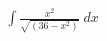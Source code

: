 \documentclass[preview]{standalone}
\begin{document}
\begin{align*}
\int \frac{x^2}{\sqrt{(36-x^2)}} \ dx
\end{align*}
\end{document}
